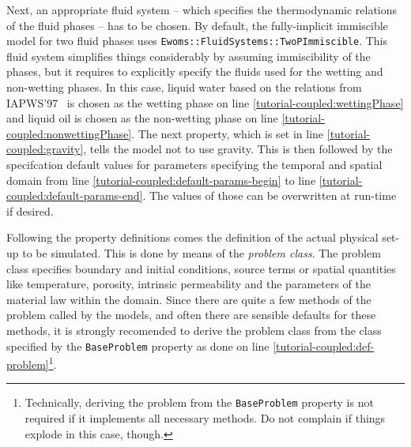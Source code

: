 Next, an appropriate fluid system -- which specifies the thermodynamic
relations of the fluid phases -- has to be chosen. By default, the
fully-implicit immiscible model for two fluid phases uses
\texttt{Ewoms::FluidSystems::TwoPImmiscible}. This fluid system
simplifies things considerably by assuming immiscibility of the
phases, but it requires to explicitly specify the fluids used for the
wetting and non-wetting phases. In this case, liquid water based on
the relations from IAPWS'97~\cite{IAPWS1997} is chosen as the wetting
phase on line \ref{tutorial-coupled:wettingPhase} and liquid oil is
chosen as the non-wetting phase on line
\ref{tutorial-coupled:nonwettingPhase}. The next property, which is
set in line \ref{tutorial-coupled:gravity}, tells the model not to use
gravity. This is then followed by the specifcation default values for
parameters specifying the temporal and spatial domain from line
\ref{tutorial-coupled:default-params-begin} to line
\ref{tutorial-coupled:default-params-end}.  The values of those can be
overwritten at run-time if desired.

Following the property definitions comes the definition of the actual
physical set-up to be simulated. This is done by means of the
\textit{problem class}. The problem class specifies boundary and
initial conditions, source terms or spatial quantities like
temperature, porosity, intrinsic permeability and the parameters of
the material law within the domain. Since there are quite a few
methods of the problem called by the \eWoms models, and often there
are sensible defaults for these methods, it is strongly recomended to
derive the problem class from the class specified by the
\texttt{BaseProblem} property as done on line
\ref{tutorial-coupled:def-problem}\footnote{Technically, deriving the
  problem from the \texttt{BaseProblem} property is not required if it
  implements all necessary methods. Do not complain if things explode
  in this case, though.}.

